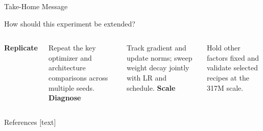 \documentclass[aspectratio=169,11pt]{beamer}
\begin{document}
\begin{frame}{Take-Home Message}
  \begin{center}
    \Large How should this experiment be extended?
  \end{center}
  \vspace{0.8cm}
  \begin{columns}[T]
      \centering
      \textbf{Replicate}\par
      \vspace{0.2cm}
      Repeat the key optimizer and architecture comparisons across multiple seeds.
      \centering
      \textbf{Diagnose}\par
      \vspace{0.2cm}
      Track gradient and update norms; sweep weight decay jointly with LR and schedule.
      \centering
      \textbf{Scale}\par
      \vspace{0.2cm}
      Hold other factors fixed and validate selected recipes at the 317M scale.
  \end{columns}
\end{frame}

\begin{frame}[allowframebreaks]{References}
  \scriptsize
  [text]
  
  
\end{frame}
\end{document}
